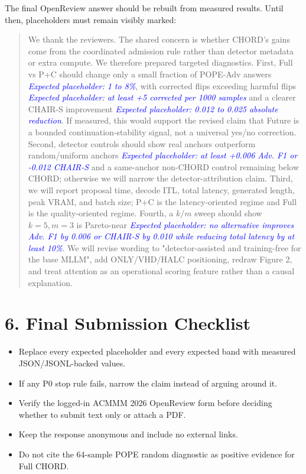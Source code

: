 \documentclass[10pt]{article}
\newcommand{\expected}[1]{\textcolor{blue}{\emph{Expected placeholder: #1}}}
\begin{document}
The final OpenReview answer should be rebuilt from measured results. Until then, placeholders must remain visibly marked:

\begin{quote}\small
We thank the reviewers. The shared concern is whether CHORD's gains come from the coordinated admission rule rather than detector metadata or extra compute. We therefore prepared targeted diagnostics. First, Full vs P+C should change only a small fraction of POPE-Adv answers \expected{1 to 8\%}, with corrected flips exceeding harmful flips \expected{at least +5 corrected per 1000 samples} and a clearer CHAIR-S improvement \expected{0.012 to 0.025 absolute reduction}. If measured, this would support the revised claim that Future is a bounded continuation-stability signal, not a universal yes/no correction. Second, detector controls should show real anchors outperform random/uniform anchors \expected{at least +0.006 Adv. F1 or -0.012 CHAIR-S} and a same-anchor non-CHORD control remaining below CHORD; otherwise we will narrow the detector-attribution claim. Third, we will report proposal time, decode ITL, total latency, generated length, peak VRAM, and batch size; P+C is the latency-oriented regime and Full is the quality-oriented regime. Fourth, a $k/m$ sweep should show $k=5,m=3$ is Pareto-near \expected{no alternative improves Adv. F1 by 0.006 or CHAIR-S by 0.010 while reducing total latency by at least 10\%}. We will revise wording to "detector-assisted and training-free for the base MLLM", add ONLY/VHD/HALC positioning, redraw Figure 2, and treat attention as an operational scoring feature rather than a causal explanation.
\end{quote}

\section*{6. Final Submission Checklist}

\begin{itemize}
\item Replace every expected placeholder and every expected band with measured JSON/JSONL-backed values.
\item If any P0 stop rule fails, narrow the claim instead of arguing around it.
\item Verify the logged-in ACMMM 2026 OpenReview form before deciding whether to submit text only or attach a PDF.
\item Keep the response anonymous and include no external links.
\item Do not cite the 64-sample POPE random diagnostic as positive evidence for Full CHORD.
\end{itemize}
\end{document}
